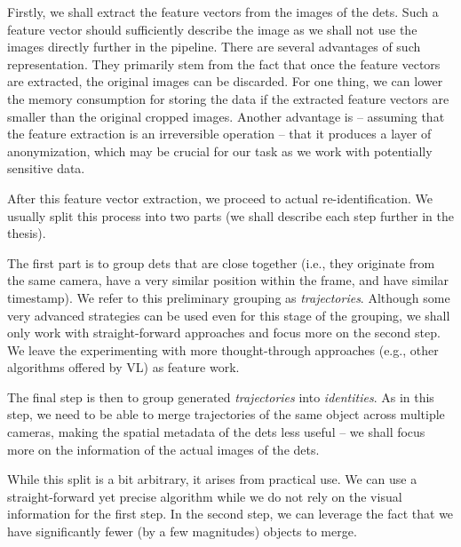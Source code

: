 Firstly, we shall extract the feature vectors from the images of the \glspl{det}. Such a feature vector should sufficiently describe the image as we shall not use the images directly further in the pipeline. There are several advantages of such representation. They primarily stem from the fact that once the feature vectors are extracted, the original images can be discarded. For one thing, we can lower the memory consumption for storing the data if the extracted feature vectors are smaller than the original cropped images. Another advantage is -- assuming that the feature extraction is an irreversible operation -- that it produces a layer of anonymization, which may be crucial for our task as we work with potentially sensitive data.

After this feature vector extraction, we proceed to actual re-identification. We usually split this process into two parts (we shall describe each step further in the thesis).

The first part is to group \glspl{det} that are close together (i.e., they originate from the same camera, have a very similar position within the frame, and have similar timestamp). We refer to this preliminary grouping as \emph{trajectories}. Although some very advanced strategies can be used even for this stage of the grouping, we shall only work with straight-forward approaches and focus more on the second step. We leave the experimenting with more thought-through approaches (e.g., other algorithms offered by \gls{VL}) as feature work.


The final step is then to group generated \emph{trajectories} into \emph{identities}. As in this step, we need to be able to merge trajectories of the same object across multiple cameras, making the spatial metadata of the \glspl{det} less useful -- we shall focus more on the information of the actual images of the \glspl{det}.

While this split is a bit arbitrary, it arises from practical use. We can use a straight-forward yet precise algorithm while we do not rely on the visual information for the first step. In the second step, we can leverage the fact that we have significantly fewer (by a few magnitudes) objects to merge.
